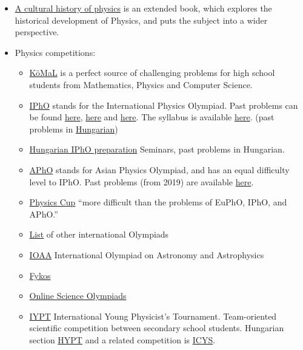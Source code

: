 \documentclass{article}
\begin{document}
\begin{itemize}
\item \href{https://www.goodreads.com/book/show/13335561-a-cultural-history-of-physics}{A cultural history of physics} is an extended book, which explores the historical development of Physics, and puts the subject into a wider perspective.

\item Physics competitions:
\begin{itemize}
\item \href{https://www.komal.hu/home.e.shtml}{KöMaL} is a perfect source of challenging problems for high school students from Mathematics, Physics and Computer Science.

\item \href{https://ipho-unofficial.org/}{IPhO} stands for the International Physics Olympiad. Past problems can be found \href{https://physprob.com/}{here}, \href{https://fks.sk/~bzduso/physics/ipho/}{here} and \href{https://omega4edu.org/physics.html}{here}. The syllabus is available \href{https://www.ipho-new.org/statutes-syllabus/}{here}. (past problems in \href{http://ipho.elte.hu/iphos.php}{Hungarian})

\item \href{http://ipho.elte.hu/}{Hungarian IPhO preparation} Seminars, past problems in Hungarian.

\item \href{http://asianphysicsolympiad.org/}{APhO} stands for Asian Physics Olympiad, and has an equal difficulty level to IPhO. Past problems (from 2019) are available \href{https://apho2019.asi.edu.au/resources/past-questions/}{here}.

\item \href{https://physicscup.ee/}{Physics Cup} ``more difficult than the problems of EuPhO, IPhO, and APhO.''

\item \href{http://eik.bme.hu/~vanko/fizika/olimpia.htm}{List} of other international Olympiads

\item \href{http://www.ioaastrophysics.org/}{IOAA} International Olympiad on Astronomy and Astrophysics

\item \href{https://fykos.org/en}{Fykos}

\item \href{https://www.onlinescienceolympiads.org/}{Online Science Olympiads}

\item \href{https://www.iypt.org/}{IYPT} International Young Physicist's Tournament. Team-oriented scientific competition between secondary school students. Hungarian section \href{http://hypt.elte.hu/}{HYPT} and a related competition is \href{http://metal.elte.hu/~icys/}{ICYS}.


\end{itemize}
\end{itemize}
\end{document}
